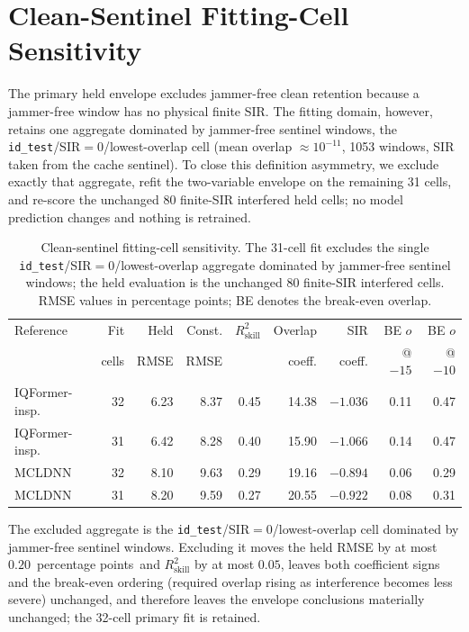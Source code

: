\documentclass[letterpaper,onecolumn,11pt,journal]{IEEEtran}
\newcommand{\pp}{percentage points}
\begin{document}
\section{Clean-Sentinel Fitting-Cell Sensitivity}
The primary held envelope excludes jammer-free clean retention because a
jammer-free window has no physical finite SIR. The fitting domain, however,
retains one aggregate dominated by jammer-free sentinel windows, the
\texttt{id\_test}/SIR$=0$/lowest-overlap cell (mean overlap
$\approx10^{-11}$, 1053 windows, SIR taken from the cache sentinel). To
close this definition asymmetry, we exclude exactly that aggregate, refit
the two-variable envelope on the remaining 31 cells, and re-score the
unchanged 80 finite-SIR interfered held cells; no model prediction changes
and nothing is retrained.

\begin{table}[t]
\centering
\caption{Clean-sentinel fitting-cell sensitivity. The 31-cell fit excludes
the single \texttt{id\_test}/SIR$=0$/lowest-overlap aggregate dominated by
jammer-free sentinel windows; the held evaluation is the unchanged 80
finite-SIR interfered cells. RMSE values in \pp; BE denotes the break-even
overlap.}
\label{tab:sentinel}
\scriptsize
\setlength{\tabcolsep}{2.0pt}
\begin{tabular}{lrrrrrrrr}
\toprule
Reference & Fit & Held & Const. & $R^2_{\mathrm{skill}}$ & Overlap & SIR & BE $o$ & BE $o$\\
& cells & RMSE & RMSE & & coeff. & coeff. & @ $-15$ & @ $-10$\\
\midrule
IQFormer-insp. & 32 & 6.23 & 8.37 & 0.45 & 14.38 & $-1.036$ & 0.11 & 0.47\\
IQFormer-insp. & 31 & 6.42 & 8.28 & 0.40 & 15.90 & $-1.066$ & 0.14 & 0.47\\
\midrule
MCLDNN & 32 & 8.10 & 9.63 & 0.29 & 19.16 & $-0.894$ & 0.06 & 0.29\\
MCLDNN & 31 & 8.20 & 9.59 & 0.27 & 20.55 & $-0.922$ & 0.08 & 0.31\\
\bottomrule
\end{tabular}
\end{table}

The excluded aggregate is the \texttt{id\_test}/SIR$=0$/lowest-overlap cell
dominated by jammer-free sentinel windows. Excluding it moves the held RMSE
by at most $0.20$~\pp\ and $R^2_{\mathrm{skill}}$ by at most $0.05$, leaves
both coefficient signs and the break-even ordering (required overlap rising
as interference becomes less severe) unchanged, and therefore leaves the
envelope conclusions materially unchanged; the 32-cell primary fit is
retained.
\end{document}
